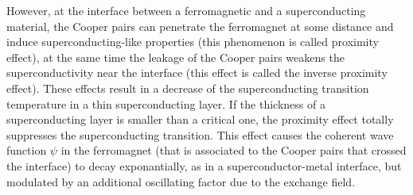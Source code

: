 \documentclass[12pt,a4paper,oneside,openany]{book}
\begin{document}
However, at the interface between a ferromagnetic and a superconducting material, the Cooper pairs can penetrate the ferromagnet at some distance and induce superconducting-like properties (this phenomenon is called proximity effect), at the same time the leakage of the Cooper pairs weakens the superconductivity near the interface (this effect is called the inverse proximity effect). These effects result in a decrease of the superconducting transition temperature in a thin superconducting layer. If the thickness of a superconducting layer is smaller than a critical one, the proximity effect totally suppresses the superconducting transition. This effect causes the coherent wave function $\psi$ in the ferromagnet (that is associated to the Cooper pairs that crossed the interface) to decay exponantially, as in a superconductor-metal interface, but modulated by an additional oscillating factor due to the exchange field.
\end{document}
